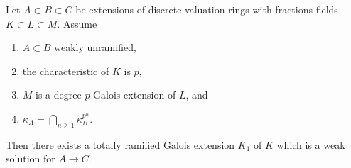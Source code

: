 \begin{lemma}
\label{lemma-characteristic-p-case}
Let $A \subset B \subset C$ be extensions of discrete valuation rings
with fractions fields $K \subset L \subset M$. Assume
\begin{enumerate}
\item $A \subset B$ weakly unramified,
\item the characteristic of $K$ is $p$,
\item $M$ is a degree $p$ Galois extension of $L$, and
\item $\kappa_A = \bigcap_{n \geq 1} \kappa_B^{p^n}$.
\end{enumerate}
Then there exists a totally ramified Galois extension $K_1$ of $K$
which is a weak solution for $A \to C$.
\end{lemma}

